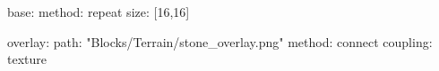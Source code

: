 base:
  method: repeat
  size: [16,16]

overlay:
  path: "Blocks/Terrain/stone_overlay.png"
  method: connect
  coupling: texture
